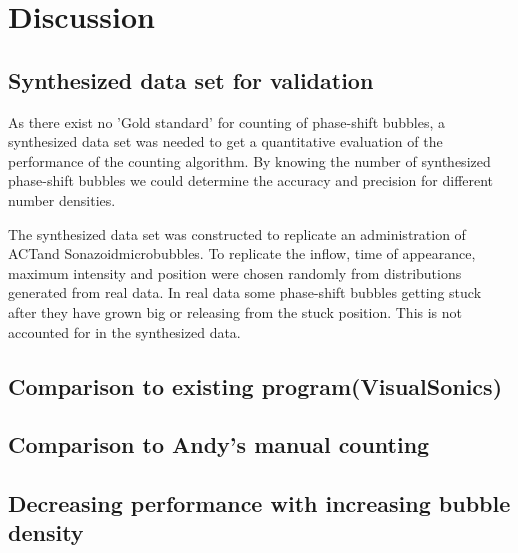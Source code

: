 \section{Discussion}

\subsection{Synthesized data set for validation}
As there exist no 'Gold standard' for counting of phase-shift bubbles, a synthesized data set was needed to get a quantitative evaluation of the performance of the counting algorithm. By knowing the number of synthesized phase-shift bubbles we could determine the accuracy and precision for different number densities.

The synthesized data set was constructed to replicate an administration of ACT\textregistered and Sonazoid\texttrademark microbubbles. To replicate the inflow, time of appearance, maximum intensity and position were chosen randomly from distributions generated from real data. In real data some phase-shift bubbles getting stuck after they have grown big or releasing from the stuck position. This is not accounted for in the synthesized data. 


\subsection{Comparison to existing program(VisualSonics)}
\subsection{Comparison to Andy's manual counting}

\subsection{Decreasing performance with increasing bubble density}
